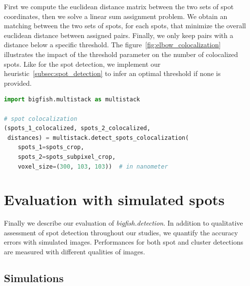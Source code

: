First we compute the euclidean distance matrix between the two sets of spot coordinates, then we solve a linear sum assignment problem\cite{crouse_linear_assignment_2016, 2020SciPy-NMeth}.
We obtain an matching between the two sets of spots, for each spots, that minimize the overall euclidean distance between assigned pairs.
Finally, we only keep pairs with a distance below a specific threshold.
The figure~\ref{fig:elbow_colocalization} illustrates the impact of the threshold parameter on the number of colocalized spots.
Like for the spot detection, we implement our heuristic~\ref{subsec:spot_detection} to infer an optimal threshold if none is provided.\\

\begin{minipage}{0.9\textwidth}
\begin{lstlisting}[language=Python]
import bigfish.multistack as multistack

# spot colocalization
(spots_1_colocalized, spots_2_colocalized,
 distances) = multistack.detect_spots_colocalization(
	spots_1=spots_crop,
	spots_2=spots_subpixel_crop,
	voxel_size=(300, 103, 103))  # in nanometer
\end{lstlisting}
\end{minipage}


\section{Evaluation with simulated spots} \label{sec:detection_evaluation}

Finally we describe our evaluation of \emph{bigfish.detection}.
In addition to qualitative assessment of spot detection throughout our studies, we quantify the accuracy errors with simulated images.
Performances for both spot and cluster detections are measured with different qualities of images.

\subsection{Simulations} \label{subsec:simulation}

